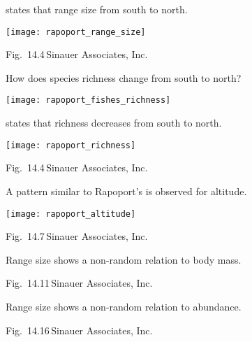 \documentclass[t]{beamer}
\begin{document}
%
\begin{frame}[t]{ states that range size  from south to north.}
	\begin{center}
		\texttt{[image: rapoport\_range\_size]}
	\end{center}

	\vfilll

	\tiny \hfill Fig.~14.4\,\textcopyright Sinauer Associates, Inc.

\end{frame}
%
\begin{frame}[t]{How does species richness change from south to north?}
	\begin{center}
		\texttt{[image: rapoport\_fishes\_richness]}
	\end{center}

\end{frame}
%
\begin{frame}[t]{ states that richness decreases from south to north.}
	\begin{center}
		\texttt{[image: rapoport\_richness]}
	\end{center}

	\vfilll

	\tiny \hfill Fig.~14.4\,\textcopyright Sinauer Associates, Inc.

\end{frame}
%
\begin{frame}[t]{A pattern similar to Rapoport's is observed for altitude.}
	\begin{center}
		\texttt{[image: rapoport\_altitude]}
	\end{center}


	\vfilll

	\tiny \hfill Fig.~14.7\,\textcopyright Sinauer Associates, Inc.

\end{frame}
%
{
\begin{frame}[t]{Range size shows a non-random relation to body mass.}

	\vfilll

	\tiny \hfill Fig.~14.11\,\textcopyright Sinauer Associates, Inc.

\end{frame}
}
%
{
\begin{frame}[t]{Range size shows a non-random relation to abundance.}

	\vfilll

	\tiny \hfill Fig.~14.16\,\textcopyright Sinauer Associates, Inc.
\end{frame}
}
\end{document}

